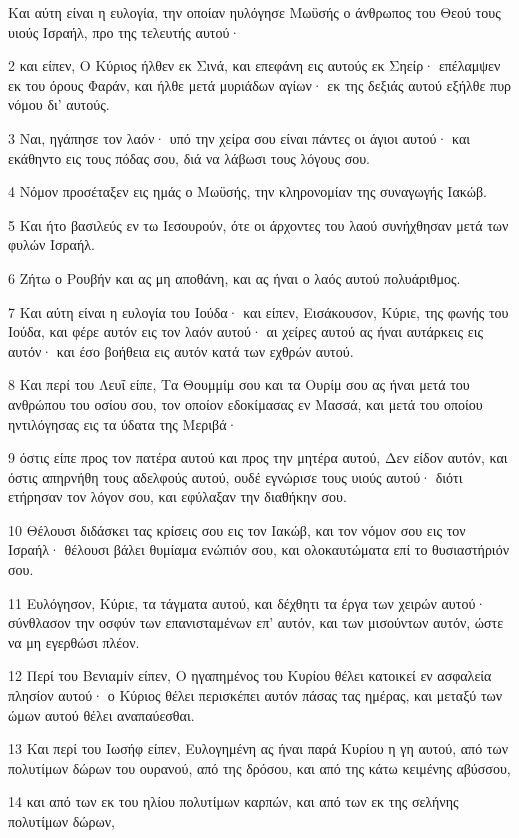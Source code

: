 \par Και αύτη είναι η ευλογία, την οποίαν ηυλόγησε Μωϋσής ο άνθρωπος του Θεού τους υιούς Ισραήλ, προ της τελευτής αυτού·
\par 2 και είπεν, Ο Κύριος ήλθεν εκ Σινά, και επεφάνη εις αυτούς εκ Σηείρ· επέλαμψεν εκ του όρους Φαράν, και ήλθε μετά μυριάδων αγίων· εκ της δεξιάς αυτού εξήλθε πυρ νόμου δι' αυτούς.
\par 3 Ναι, ηγάπησε τον λαόν· υπό την χείρα σου είναι πάντες οι άγιοι αυτού· και εκάθηντο εις τους πόδας σου, διά να λάβωσι τους λόγους σου.
\par 4 Νόμον προσέταξεν εις ημάς ο Μωϋσής, την κληρονομίαν της συναγωγής Ιακώβ.
\par 5 Και ήτο βασιλεύς εν τω Ιεσουρούν, ότε οι άρχοντες του λαού συνήχθησαν μετά των φυλών Ισραήλ.
\par 6 Ζήτω ο Ρουβήν και ας μη αποθάνη, και ας ήναι ο λαός αυτού πολυάριθμος.
\par 7 Και αύτη είναι η ευλογία του Ιούδα· και είπεν, Εισάκουσον, Κύριε, της φωνής του Ιούδα, και φέρε αυτόν εις τον λαόν αυτού· αι χείρες αυτού ας ήναι αυτάρκεις εις αυτόν· και έσο βοήθεια εις αυτόν κατά των εχθρών αυτού.
\par 8 Και περί του Λευΐ είπε, Τα Θουμμίμ σου και τα Ουρίμ σου ας ήναι μετά του ανθρώπου του οσίου σου, τον οποίον εδοκίμασας εν Μασσά, και μετά του οποίου ηντιλόγησας εις τα ύδατα της Μεριβά·
\par 9 όστις είπε προς τον πατέρα αυτού και προς την μητέρα αυτού, Δεν είδον αυτόν, και όστις απηρνήθη τους αδελφούς αυτού, ουδέ εγνώρισε τους υιούς αυτού· διότι ετήρησαν τον λόγον σου, και εφύλαξαν την διαθήκην σου.
\par 10 Θέλουσι διδάσκει τας κρίσεις σου εις τον Ιακώβ, και τον νόμον σου εις τον Ισραήλ· θέλουσι βάλει θυμίαμα ενώπιόν σου, και ολοκαυτώματα επί το θυσιαστήριόν σου.
\par 11 Ευλόγησον, Κύριε, τα τάγματα αυτού, και δέχθητι τα έργα των χειρών αυτού· σύνθλασον την οσφύν των επανισταμένων επ' αυτόν, και των μισούντων αυτόν, ώστε να μη εγερθώσι πλέον.
\par 12 Περί του Βενιαμίν είπεν, Ο ηγαπημένος του Κυρίου θέλει κατοικεί εν ασφαλεία πλησίον αυτού· ο Κύριος θέλει περισκέπει αυτόν πάσας τας ημέρας, και μεταξύ των ώμων αυτού θέλει αναπαύεσθαι.
\par 13 Και περί του Ιωσήφ είπεν, Ευλογημένη ας ήναι παρά Κυρίου η γη αυτού, από των πολυτίμων δώρων του ουρανού, από της δρόσου, και από της κάτω κειμένης αβύσσου,
\par 14 και από των εκ του ηλίου πολυτίμων καρπών, και από των εκ της σελήνης πολυτίμων δώρων,

